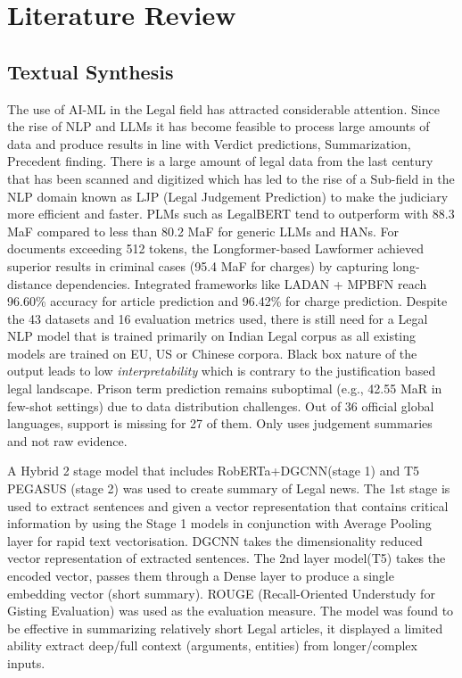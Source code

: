 \chapter{Literature Review}{\label{ch:lit_review}}

\section*{Textual Synthesis}
\noindent The use of AI-ML in the Legal field has attracted considerable attention. Since the rise of NLP and LLMs it has become feasible to process large amounts of data and produce results in line with Verdict predictions, Summarization, Precedent finding. There is a large amount of legal data from the last century that has been scanned and digitized which has led to the rise of a Sub-field in the NLP domain known as LJP (Legal Judgement Prediction) \cite{b1} to make the judiciary more efficient and faster. PLMs such as LegalBERT tend to outperform with 88.3 MaF compared to less than 80.2 MaF for generic LLMs and HANs. For documents exceeding 512 tokens, the Longformer-based Lawformer achieved superior results in criminal cases (95.4 MaF for charges) by capturing long-distance dependencies. Integrated frameworks like LADAN + MPBFN reach 96.60\% accuracy for article prediction and 96.42\% for charge prediction. Despite the 43 datasets and 16 evaluation metrics used, there is still need for a Legal NLP model that is trained primarily on Indian Legal corpus as all existing models are trained on EU, US or Chinese corpora. Black box nature of the output leads to low \emph{interpretability} which is contrary to the justification based legal landscape. Prison term prediction remains suboptimal (e.g., 42.55 MaR in few-shot settings) due to data distribution challenges. Out of 36 official global languages, support is missing for 27 of them. Only uses judgement summaries and not raw evidence.


A Hybrid 2 stage model that includes RobERTa+DGCNN(stage 1) and T5 PEGASUS (stage 2) was used to create summary of Legal news\cite{b2}. The 1st stage is used to extract sentences and given a vector representation that contains critical information by using the Stage 1 models in conjunction with Average Pooling layer for rapid text vectorisation. DGCNN takes the dimensionality reduced vector representation of extracted sentences. The 2nd layer model(T5) takes the encoded vector, passes them through a Dense layer to produce a single embedding vector (short summary). ROUGE (Recall-Oriented Understudy for Gisting Evaluation) was used as the evaluation measure. The model was found to be effective in summarizing relatively short Legal articles, it displayed a limited ability extract deep/full context (arguments, entities) from longer/complex inputs.






